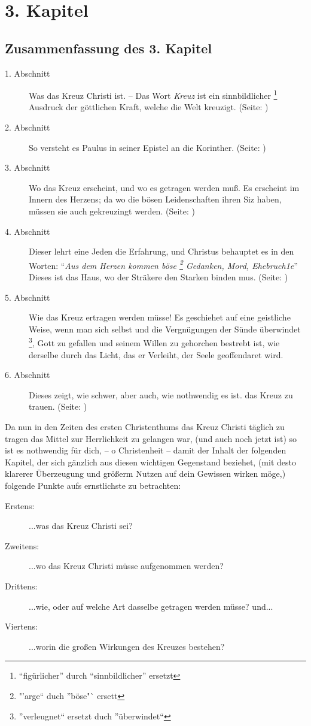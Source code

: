 
\chapter{3. Kapitel} \label{kap3}

\section{Zusammenfassung des 3. Kapitel}

\footnotesize
\begin{description}
\item[1. Abschnitt] Was das Kreuz Christi ist. -- Das Wort \textit{Kreuz} ist ein
sinnbildlicher \footnote{"`figürlicher"' durch "`sinnbildlicher"' ersetzt} 
Ausdruck der göttlichen Kraft, welche die Welt kreuzigt.
(Seite: \pageref{kap3_ab1})
\item[2. Abschnitt] So versteht es Paulus in seiner Epistel an die
Korinther. (Seite: \pageref{kap3_ab2})
\item[3. Abschnitt] Wo das Kreuz erscheint, und wo es getragen werden muß. Es
erscheint im Innern des Herzens; da wo die bösen Leidenschaften ihren Siz haben,
müssen sie auch gekreuzingt werden. (Seite: \pageref{kap3_ab3})
\item[4. Abschnitt] Dieser lehrt eine Jeden die Erfahrung, und Christus
behauptet es in den Worten: "`\textit{Aus dem Herzen kommen böse \footnote{
"'arge"` duch "'böse"` ersett} Gedanken, Mord,
Ehebruch1e}"' Dieses ist das Haus, wo der Sträkere den Starken binden mus.
(Seite: \pageref{kap3_ab4})
\item[5. Abschnitt] Wie das Kreuz ertragen werden müsse! Es geschiehet auf eine
geistliche Weise, wenn man sich selbst und die Vergnügungen der Sünde überwindet
\footnote{''verleugnet`` ersetzt duch ''überwindet``}, Gott zu gefallen und 
seinem Willen zu gehorchen bestrebt ist, wie
derselbe durch das Licht, das er Verleiht, der Seele geoffendaret wird.
\item[6. Abschnitt] Dieses zeigt, wie schwer, aber auch, wie nothwendig es ist.
das Kreuz zu trauen. (Seite: \pageref{kap3_ab5})
\end{description}
\normalsize

Da nun in den Zeiten des ersten Christenthums das Kreuz Christi täglich zu
tragen das Mittel zur Herrlichkeit zu gelangen war, (und auch noch jetzt ist)
so ist es nothwendig für dich, -- o Christenheit -- damit der Inhalt der folgenden
Kapitel, der sich gänzlich aus diesen wichtigen Gegenstand beziehet, (mit desto
klarerer Überzeugung und größerm Nutzen auf dein Gewissen wirken möge,) 
folgende Punkte aufs ernstlichste zu betrachten:
\begin{description}
\item[Erstens:] ...was das Kreuz Christi sei?
\item[Zweitens:] ...wo das Kreuz Christi müsse aufgenommen werden?
\item[Drittens:] ...wie, oder auf welche Art dasselbe getragen werden müsse? und...
\item[Viertens:] ...worin die großen Wirkungen des Kreuzes bestehen?
\end{description}


